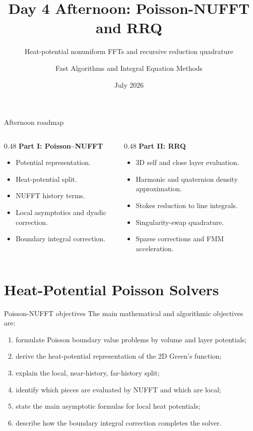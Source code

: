 \documentclass[aspectratio=169,11pt]{beamer}
\title{Day 4 Afternoon: Poisson-NUFFT and RRQ}
\subtitle{Heat-potential nonuniform FFTs and recursive reduction quadrature}
\author{Fast Algorithms and Integral Equation Methods}
\institute{AMSS Summer Course}
\date{July 2026}
\begin{document}
\begin{frame}
  \titlepage
\end{frame}

\begin{frame}{Afternoon roadmap}
\footnotesize
\begin{columns}[T,totalwidth=\textwidth]
\begin{column}{0.48\textwidth}
\textbf{Part I: Poisson--NUFFT}
\begin{itemize}
  \item Potential representation.
  \item Heat-potential split.
  \item NUFFT history terms.
  \item Local asymptotics and dyadic correction.
  \item Boundary integral correction.
\end{itemize}
\end{column}
\begin{column}{0.48\textwidth}
\textbf{Part II: RRQ}
\begin{itemize}
  \item 3D self and close layer evaluation.
  \item Harmonic and quaternion density approximation.
  \item Stokes reduction to line integrals.
  \item Singularity-swap quadrature.
  \item Sparse corrections and FMM acceleration.
\end{itemize}
\end{column}
\end{columns}
\end{frame}

\section{Heat-Potential Poisson Solvers}

\begin{frame}{Poisson-NUFFT objectives}
\small
The main mathematical and algorithmic objectives are:
\begin{enumerate}
  \item formulate Poisson boundary value problems by volume and layer potentials;
  \item derive the heat-potential representation of the 2D Green's function;
  \item explain the local, near-history, far-history split;
  \item identify which pieces are evaluated by NUFFT and which are local;
  \item state the main asymptotic formulas for local heat potentials;
  \item describe how the boundary integral correction completes the solver.
\end{enumerate}
\end{frame}
\end{document}
